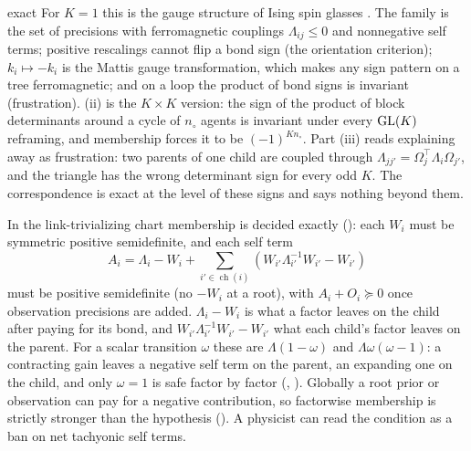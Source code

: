\begin{analogy}{exact}
For \(K=1\) this is the gauge structure of Ising spin glasses \citep{mezard1987spin}. The family is the
set of precisions with ferromagnetic couplings \(\Lambda_{ij}\leq0\) and nonnegative self terms; positive
rescalings cannot flip a bond sign (the orientation criterion); \(k_i\mapsto-k_i\) is the Mattis gauge
transformation, which makes any sign pattern on a tree ferromagnetic; and on a loop the product of bond
signs is invariant (frustration). (ii) is the \(K\times K\) version:
the sign of the product of block determinants around a cycle of \(n_\circ\) agents is invariant under
every \(\mathrm{GL}(K)\) reframing, and membership forces it to be \((-1)^{Kn_\circ}\). Part (iii) reads explaining
away as frustration: two parents of one child are coupled through
\(\Lambda_{jj'}=\Omega_j^\top\Lambda_i\Omega_{j'}\), and the triangle has the wrong determinant sign for
every odd \(K\). The correspondence is exact at the level of these signs and says nothing beyond them.
\end{analogy}

In the link-trivializing chart membership is decided exactly
(): each \(W_i\) must be symmetric positive semidefinite, and
each self term
\[
A_i=\Lambda_i-W_i+\sum_{i'\in\operatorname{ch}(i)}\left(W_{i'}\Lambda_{i'}^{-1}W_{i'}-W_{i'}\right)
\]
must be positive semidefinite (no \(-W_i\) at a root), with \(A_i+O_i\succeq0\) once observation
precisions are added. \(\Lambda_i-W_i\) is what a factor leaves on the child after paying for its bond,
and \(W_{i'}\Lambda_{i'}^{-1}W_{i'}-W_{i'}\) what each child's factor leaves on the parent. For a scalar
transition \(\omega\) these are \(\Lambda(1-\omega)\) and \(\Lambda\omega(\omega-1)\): a contracting gain
leaves a negative self term on the parent, an expanding one on the child, and only \(\omega=1\) is safe
factor by factor (, ).
Globally a root prior or observation can pay for a negative contribution, so factorwise membership is
strictly stronger than the hypothesis (). A physicist can read the
condition as a ban on net tachyonic self terms.

